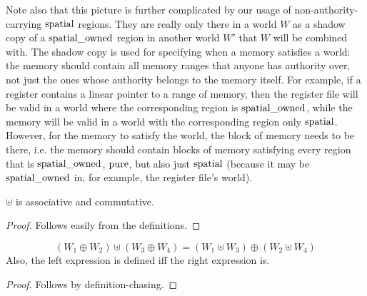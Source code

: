 \documentclass[a4paper]{article}
\begin{document}
Note also that this picture is further complicated by our usage of non-authority-carrying $\mathrm{spatial}$ regions.
They are really only there in a world $W$ as a shadow copy of a $\mathrm{spatial\_owned}$ region in another world $W'$ that $W$ will be combined with.
The shadow copy is used for specifying when a memory satisfies a world: the memory should contain all memory ranges that anyone has authority over, not just the ones whose authority belongs to the memory itself.
For example, if a register contains a linear pointer to a range of memory, then the register file will be valid in a world where the corresponding region is $\mathrm{spatial\_owned}$, while the memory will be valid in a world with the corresponding region only $\mathrm{spatial}$.
However, for the memory to satisfy the world, the block of memory needs to be there, i.e. the memory should contain blocks of memory satisfying every region that is $\mathrm{spatial\_owned}$, $\mathrm{pure}$, but also just $\mathrm{spatial}$ (because it may be $\mathrm{spatial\_owned}$ in, for example, the register file's world).

\begin{lemma}
  \label{lem:uplus-assoc-comm}
  $\uplus$ is associative and commutative.
\end{lemma}
\begin{proof}
  Follows easily from the definitions.
\end{proof}

\begin{lemma}
  \label{lem:oplus-distr-uplus}
  \begin{equation*}
    (W_1\oplus W_2) \uplus (W_3 \oplus W_4) = (W_1 \uplus W_3) \oplus (W_2 \uplus W_4)
  \end{equation*}
  Also, the left expression is defined iff the right expression is.
\end{lemma}
\begin{proof}
  Follows by definition-chasing.
\end{proof}
\end{document}
